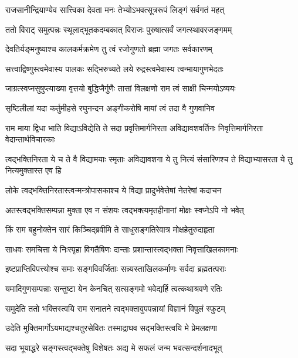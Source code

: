 \twolineshloka
{राजसानीन्द्रियाण्येव सात्त्विका देवता मनः}
{तेभ्योऽभवत्सूत्ररूपं लिङ्गं सर्वगतं महत्} %

\twolineshloka
{ततो विराट् समुत्पन्नः स्थूलाद्भूतकदम्बकात्}
{विराजः पुरुषात्सर्वं जगत्स्थावरजङ्गमम्} %

\twolineshloka
{देवतिर्यङ्मनुष्याश्च कालकर्मक्रमेण तु}
{त्वं रजोगुणतो ब्रह्मा जगतः सर्वकारणम्} %

\twolineshloka
{सत्त्वाद्विष्णुस्त्वमेवास्य पालकः सद्भिरुच्यते}
{लये रुद्रस्त्वमेवास्य त्वन्मायागुणभेदतः} %

\twolineshloka
{जाग्रत्स्वप्नसुषुप्त्याख्या वृत्तयो बुद्धिजैर्गुणैः}
{तासां विलक्षणो राम त्वं साक्षी चिन्मयोऽव्ययः} %

\twolineshloka
{सृष्टिलीलां यदा कर्तुमीहसे रघुनन्दन}
{अङ्गीकरोषि मायां त्वं तदा वै गुणवानिव} %

\threelineshloka
{राम माया द्विधा भाति विद्याऽविद्येति ते सदा}
{प्रवृत्तिमार्गनिरता अविद्यावशवर्तिनः}
{निवृत्तिमार्गनिरता वेदान्तार्थविचारकाः} %

\threelineshloka
{त्वद्भक्तिनिरता ये च ते वै विद्यामयाः स्मृताः}
{अविद्यावशगा ये तु नित्यं संसारिणश्च ते}
{विद्याभ्यासरता ये तु नित्यमुक्तास्त एव हि} %

\twolineshloka
{लोके त्वद्भक्तिनिरतास्त्वन्मन्त्रोपासकाश्च ये}
{विद्या प्रादुर्भवेत्तेषां नेतरेषां कदाचन} %

\twolineshloka
{अतस्त्वद्भक्तिसम्पन्ना मुक्ता एव न संशयः}
{त्वद्भक्त्यमृतहीनानां मोक्षः स्वप्नेऽपि नो भवेत्} %

\twolineshloka
{किं राम बहुनोक्तेन सारं किञ्चिद्ब्रवीमि ते}
{साधुसङ्गतिरेवात्र मोक्षहेतुरुदाहृता} %

\twolineshloka
{साधवः समचित्ता ये निःस्पृहा विगतैषिणः}
{दान्ताः प्रशान्तास्त्वद्भक्ता निवृत्ताखिलकामनाः} %

\twolineshloka
{इष्टप्राप्तिविपत्त्योश्च समाः सङ्गविवर्जिताः}
{सन्न्यस्ताखिलकर्माणः सर्वदा ब्रह्मतत्पराः} %

\twolineshloka
{यमादिगुणसम्पन्नाः सन्तुष्टा येन केनचित्}
{सत्सङ्गमो भवेद्यर्हि त्वत्कथाश्रवणे रतिः} %

\twolineshloka
{समुदेति ततो भक्तिस्त्वयि राम सनातने}
{त्वद्भक्तावुपपन्नायां विज्ञानं विपुलं स्फुटम्} %

\twolineshloka
{उदेति मुक्तिमार्गोऽयमाद्यश्चतुरसेवितः}
{तस्माद्राघव सद्भक्तिस्त्वयि मे प्रेमलक्षणा} %

\twolineshloka
{सदा भूयाद्धरे सङ्गस्त्वद्भक्तेषु विशेषतः}
{अद्य मे सफलं जन्म भवत्सन्दर्शनादभूत्} %

